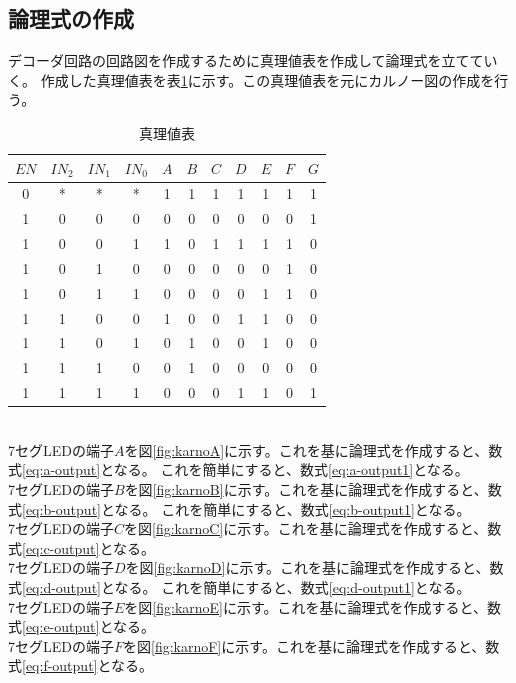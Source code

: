 \documentclass[a4paper,11pt,dvipdfmx]{jsarticle}
\begin{document}
\subsection{論理式の作成}
デコーダ回路の回路図を作成するために真理値表を作成して論理式を立てていく。
作成した真理値表を表\ref{tab:truth}に示す。この真理値表を元にカルノー図の作成を行う。
\begin{table}[h]
  \centering
  \caption{真理値表}
  \begin{tabular}{|c|c|c|c|c|c|c|c|c|c|c|}
    \hline
    $EN$ & $IN_2$ & $IN_1$ & $IN_0$ & $A$ & $B$ & $C$ & $D$ & $E$ & $F$ & $G$ \\
    \hline
    0 & * & * & * & 1 & 1 & 1 & 1 & 1 & 1 & 1 \\
    1 & 0 & 0 & 0 & 0 & 0 & 0 & 0 & 0 & 0 & 1 \\
    1 & 0 & 0 & 1 & 1 & 0 & 1 & 1 & 1 & 1 & 0 \\
    1 & 0 & 1 & 0 & 0 & 0 & 0 & 0 & 0 & 1 & 0 \\
    1 & 0 & 1 & 1 & 0 & 0 & 0 & 0 & 1 & 1 & 0 \\
    1 & 1 & 0 & 0 & 1 & 0 & 0 & 1 & 1 & 0 & 0 \\
    1 & 1 & 0 & 1 & 0 & 1 & 0 & 0 & 1 & 0 & 0 \\
    1 & 1 & 1 & 0 & 0 & 1 & 0 & 0 & 0 & 0 & 0 \\
    1 & 1 & 1 & 1 & 0 & 0 & 0 & 1 & 1 & 0 & 1 \\
    \hline
  \end{tabular}
  \label{tab:truth}
\end{table}
\\
7セグLEDの端子$A$を図\ref{fig:karnoA}に示す。これを基に論理式を作成すると、数式\eqref{eq:a-output}となる。
これを簡単にすると、数式\eqref{eq:a-output1}となる。\\
7セグLEDの端子$B$を図\ref{fig:karnoB}に示す。これを基に論理式を作成すると、数式\eqref{eq:b-output}となる。
これを簡単にすると、数式\eqref{eq:b-output1}となる。\\
7セグLEDの端子$C$を図\ref{fig:karnoC}に示す。これを基に論理式を作成すると、数式\eqref{eq:c-output}となる。\\
7セグLEDの端子$D$を図\ref{fig:karnoD}に示す。これを基に論理式を作成すると、数式\eqref{eq:d-output}となる。
これを簡単にすると、数式\eqref{eq:d-output1}となる。\\
7セグLEDの端子$E$を図\ref{fig:karnoE}に示す。これを基に論理式を作成すると、数式\eqref{eq:e-output}となる。\\
7セグLEDの端子$F$を図\ref{fig:karnoF}に示す。これを基に論理式を作成すると、数式\eqref{eq:f-output}となる。
\end{document}
